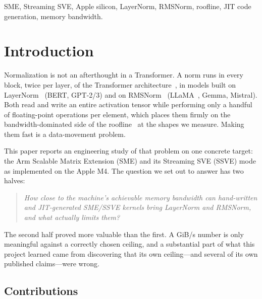 \documentclass[conference,10pt]{IEEEtran}
\begin{document}
\begin{IEEEkeywords}
SME, Streaming SVE, Apple silicon, LayerNorm, RMSNorm, roofline, JIT code
generation, memory bandwidth.
\end{IEEEkeywords}

\IEEEpeerreviewmaketitle

\section{Introduction}

Normalization is not an afterthought in a Transformer. A norm runs in every
block, twice per layer, of the Transformer architecture~\cite{vaswani2017attention},
in models built on LayerNorm~\cite{ba2016layernorm} (BERT, GPT-2/3) and on
RMSNorm~\cite{zhang2019rmsnorm} (LLaMA~\cite{touvron2023llama}, Gemma, Mistral).
Both read and write an entire activation tensor while performing only a handful
of floating-point operations per element, which places them firmly on the
bandwidth-dominated side of the roofline~\cite{williams2009roofline} at the
shapes we measure. Making them fast is a data-movement problem.

This paper reports an engineering study of that problem on one concrete target:
the Arm Scalable Matrix Extension (SME) and its Streaming SVE (SSVE) mode as
implemented on the Apple M4. The question we set out to answer has two halves:

\begin{quote}
\emph{How close to the machine's achievable memory bandwidth can hand-written
and JIT-generated SME/SSVE kernels bring LayerNorm and RMSNorm, and what
actually limits them?}
\end{quote}

The second half proved more valuable than the first. A GiB/s number is only
meaningful against a correctly chosen ceiling, and a substantial part of what
this project learned came from discovering that its own ceiling---and several of
its own published claims---were wrong.

\subsection*{Contributions}
\end{document}
